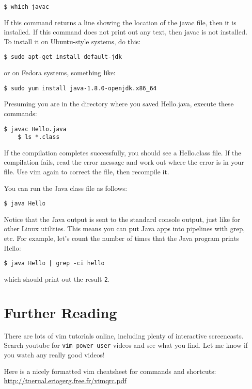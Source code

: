 \documentclass{article}
\begin{document}
\begin{lstlisting}[style=BashInputStyle]
    $ which javac
\end{lstlisting}

If this command returns a line showing the location of the javac file, then it is installed. If this command does not print out any text, then javac is not installed. To install it on Ubuntu-style systems, do this:

\begin{lstlisting}[style=BashInputStyle]
    $ sudo apt-get install default-jdk
\end{lstlisting}

or on Fedora systems, something like:

\begin{lstlisting}[style=BashInputStyle]
    $ sudo yum install java-1.8.0-openjdk.x86_64
\end{lstlisting}

Presuming you are in the directory where you saved Hello.java, execute these commands:

\begin{lstlisting}[style=BashInputStyle]
    $ javac Hello.java
    $ ls *.class
\end{lstlisting}

If the compilation completes successfully, you should see a Hello.class file. If the compilation fails, read the error message and work out where the error is in your file. Use vim again to correct the file, then recompile it.

You can run the Java class file as follows:
\begin{lstlisting}[style=BashInputStyle]
    $ java Hello
\end{lstlisting}

Notice that the Java output is sent to the standard console output, just like for other Linux utilities. This means you can put Java apps into pipelines with grep, etc. For example, let's count the number of times that the Java program prints Hello:
\begin{lstlisting}[style=BashInputStyle]
    $ java Hello | grep -ci hello
\end{lstlisting}

which should print out the result \texttt{2}.

\section*{Further Reading}

There are lots of vim tutorials online, including plenty of interactive screencasts. Search youtube for \texttt{vim power user} videos and see what you find. Let me know if you watch any really good videos!

Here is a nicely formatted vim cheatsheet for commands and shortcuts:
\url{http://tnerual.eriogerg.free.fr/vimqrc.pdf}
\end{document}
